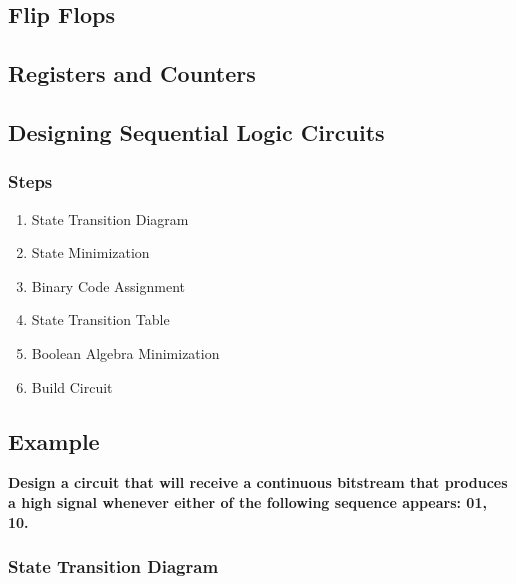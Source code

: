 \documentclass[11pt]{article}
\begin{document}
\subsection{Flip Flops}

\subsection{Registers and Counters}

\subsection{Designing Sequential Logic Circuits}

\subsubsection{Steps}

\begin{enumerate}
	\item State Transition Diagram
	\item State Minimization
	\item Binary Code Assignment
	\item State Transition Table
	\item Boolean Algebra Minimization
	\item Build Circuit
\end{enumerate}

\subsection{Example}

\textbf{Design a circuit that will receive a continuous bitstream that produces a high signal whenever either of the following sequence appears: 01, 10.}

\subsubsection{State Transition Diagram}
\end{document}
